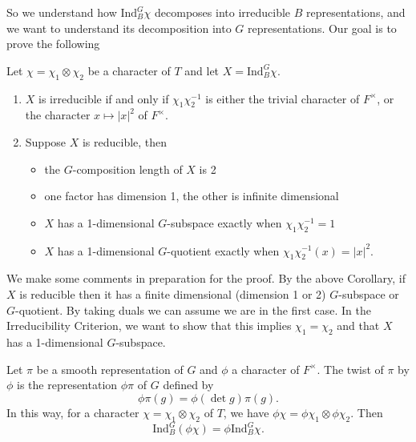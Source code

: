So we understand how $\mathrm{Ind}_B^G \chi$ decomposes into irreducible $B$ representations, and we want to understand its decomposition into $G$ representations. Our goal is to prove the following

\begin{thm}\label{criterion}
    Let $\chi = \chi_1 \otimes \chi_2$ be a character of $T$ and let $X = \mathrm{Ind}_B^G \chi$.
    \begin{enumerate}
        \item $X$ is irreducible if and only if $\chi_1\chi_2^{-1}$ is either the trivial character of $F^\times$, or the character $x \mapsto |x|^2$ of $F^\times$.
        \item Suppose $X$ is reducible, then \begin{itemize}
            \item the $G$-composition length of $X$ is 2
            \item one factor has dimension 1, the other is infinite dimensional
            \item $X$ has a 1-dimensional $G$-subspace exactly when $\chi_1\chi_2^{-1}=1$
            \item $X$ has a 1-dimensional $G$-quotient exactly when $\chi_1\chi_2^{-1}(x) = |x|^2$.
        \end{itemize}
    \end{enumerate}
\end{thm}

We make some comments in preparation for the proof. By the above Corollary, if $X$ is reducible then it has a finite dimensional (dimension 1 or 2) $G$-subspace or $G$-quotient. By taking duals we can assume we are in the first case. In the Irreducibility Criterion, we want to show that this implies $\chi_1 = \chi_2$ and that $X$ has a 1-dimensional $G$-subspace.

\begin{defn}
    Let $\pi$ be a smooth representation of $G$ and $\phi$ a character of $F^\times$. The twist of $\pi$ by $\phi$ is the representation $\phi\pi$ of $G$ defined by 
    $$\phi \pi(g) = \phi (\det g)\pi(g).$$
    In this way, for a character $\chi=\chi_1 \otimes \chi_2$ of $T$, we have $\phi\chi = \phi\chi_1 \otimes \phi\chi_2$. Then 
    $$\mathrm{Ind}_B^G(\phi\chi) = \phi \mathrm{Ind}_B^G \chi.$$
\end{defn}

